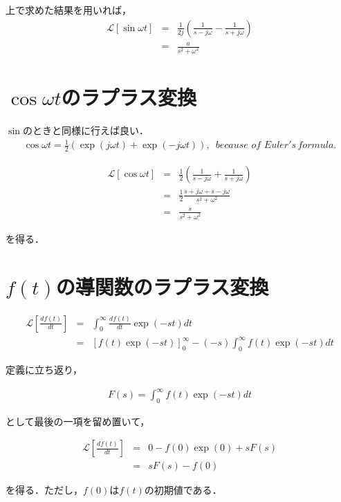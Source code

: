 \documentclass[a4paper, 12pt]{jsarticle}
\begin{document}
上で求めた結果を用いれば，
\begin{eqnarray}
    \mathcal{L}[\sin \omega t] &=& \frac{1}{2j} \left(\frac{1}{s-j \omega} - \frac{1}{s+j \omega}\right) \\ \nonumber
&=& \frac{a}{s^2+ \omega ^2}
\end{eqnarray}

\section{$\cos \omega t$のラプラス変換}
$\sin$のときと同様に行えば良い．
\begin{eqnarray}
\cos \omega t = \frac12 (\exp(j \omega t) + \exp(-j \omega t)), \,\,\, because \,\, of \,\, Euler's \, formula.
\end{eqnarray}

\begin{eqnarray}
    \mathcal{L}[\cos \omega t] &=& \frac12 \left(\frac{1}{s-j \omega} + \frac{1}{s+j \omega} \right) \\ \nonumber
&=& \frac12 \frac{s + j \omega + s - j \omega}{s^2+ \omega ^2} \\ \nonumber
&=& \frac{s}{s^2+ \omega ^2}
\end{eqnarray}

を得る．

\section{$f(t)$の導関数のラプラス変換}
\begin{eqnarray}
\mathcal{L} \left[\frac{df(t)}{dt}\right] &=& \int_0^\infty \frac{df(t)}{dt} \exp(-st) dt \\ \nonumber
&=& \left[f(t) \exp(-st)\right]_0^\infty - (-s) \int_0^\infty f(t) \exp(-st) dt
\end{eqnarray}

定義に立ち返り，

\begin{eqnarray}
F(s) = \int_0^\infty f(t) \exp(-st) dt
\end{eqnarray}

として最後の一項を留め置いて，

\begin{eqnarray}
\mathcal{L}\left[\frac{df(t)}{dt}\right] &=& 0 - f(0) \exp(0) + sF(s) \\ \nonumber
&=& sF(s) - f(0)
\end{eqnarray}

を得る．ただし，$f(0)$は$f(t)$の初期値である．
\end{document}
